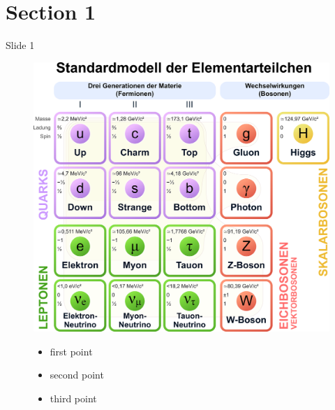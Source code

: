 \documentclass[handout]{beamer} %
\begin{document}
    \section{Section 1}
    \begin{frame}{Slide 1}
      \begin{figure}
        \centering
        \begin{minipage}{0.5\textwidth}
          \centering
          \includegraphics[width=\textwidth, keepaspectratio, height=0.85\textheight]{Standard_Model_of_Elementary_Particles_normal.png}\tiny
          \\\end{minipage}
        \hfill \pause
        \begin{minipage}{0.48\textwidth}
          \begin{itemize}
            \item first point \pause
            \item second point \pause
            \item third point \pause
          \end{itemize}
          \end{minipage}
      \end{figure}
    \end{frame}
\end{document}
